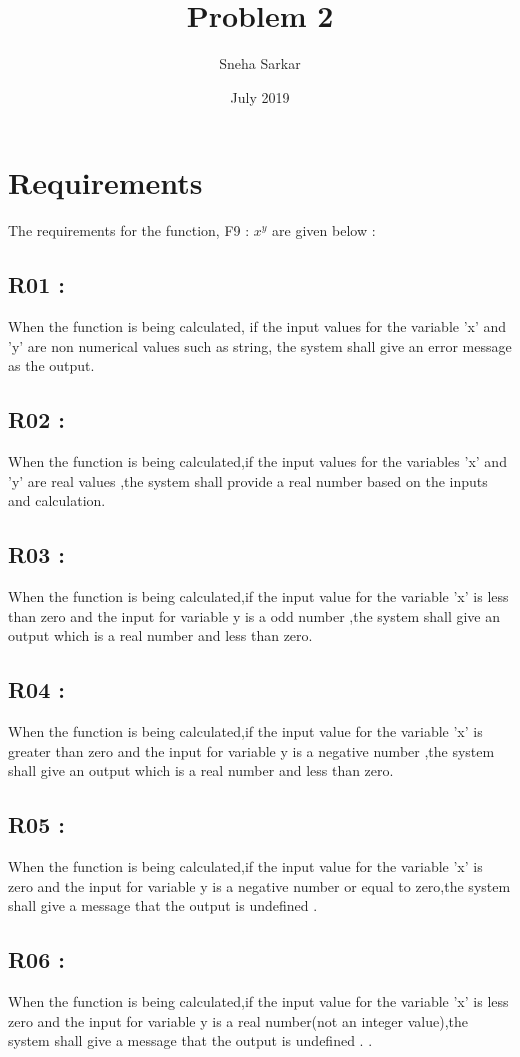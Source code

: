 \documentclass[12pt]{report}
\title{Problem 2}
\author{Sneha Sarkar}
\date{July 2019}
\begin{document}
\maketitle
\section{Requirements}The requirements for the function, F9 : $x^y$ are given below : \\
\subsection{R01 :} When the function is being calculated, if the input values for the variable 'x' and 'y' are non numerical values such as string, the system shall give an error message as the output.
\subsection{R02 :} When the function is being calculated,if the input values for the variables 'x' and 'y' are real values ,the system shall provide a real number based on the inputs and calculation.
\subsection{R03 :} When the function is being calculated,if the input value for the variable 'x' is  less than zero and the input for variable y is a odd number ,the system shall give an output which is a real number and less than zero.
\subsection{R04 :} When the function is being calculated,if the input value for the variable 'x' is  greater than zero and the input for variable y is a negative number ,the system shall give an output which is a real number and less than zero.
\subsection{R05 :} When the function is being calculated,if the input value for the variable 'x' is zero and the input for variable y is a negative number or equal to zero,the system shall give a message that the output is undefined  .
\subsection{R06 :} When the function is being calculated,if the input value for the variable 'x' is less zero and the input for variable y is a real number(not an integer value),the system shall give a message that the output is undefined  .
.
\end{document}
